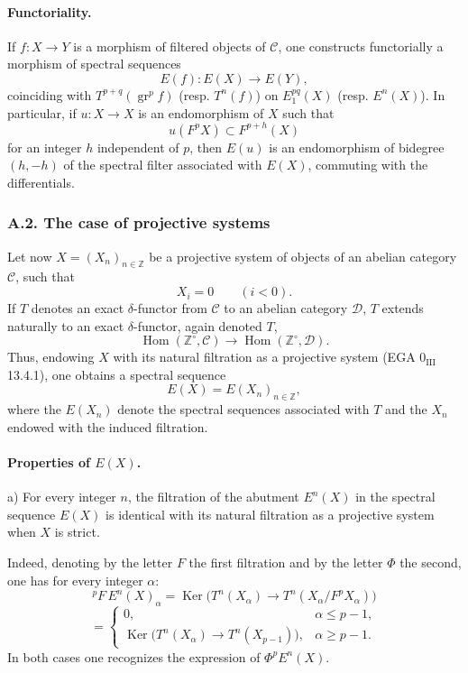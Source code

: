 \documentclass[11pt]{article}
\DeclareMathOperator{\Hom}{Hom}
\providecommand{\Ker}{\operatorname{Ker}}
\providecommand{\gr}{\operatorname{gr}}
\providecommand{\Hom}{\operatorname{Hom}}
\providecommand{\Ker}{\operatorname{Ker}}
\providecommand{\gr}{\operatorname{gr}}
\providecommand{\gr}{\operatorname{gr}}
\providecommand{\Ker}{\operatorname{Ker}}
\providecommand{\Hom}{\operatorname{Hom}}
\begin{document}
\paragraph{Functoriality.}
If \(f:X\to Y\) is a morphism of filtered objects of \(\mathcal C\), one constructs functorially a morphism of spectral sequences
\[
E(f):E(X)\longrightarrow E(Y),
\]
coinciding with \(T^{p+q}(\gr^p f)\) (resp. \(T^n(f)\)) on \(E_1^{pq}(X)\) (resp. \(E^n(X)\)). In particular, if \(u:X\to X\) is an endomorphism of \(X\) such that
\[
u(F^pX)\subset F^{p+h}(X)
\]
for an integer \(h\) independent of \(p\), then \(E(u)\) is an endomorphism of bidegree \((h,-h)\) of the spectral filter associated with \(E(X)\), commuting with the differentials.

\subsubsection*{A.2. The case of projective systems}
Let now \(X=(X_n)_{n\in\mathbb Z}\) be a projective system of objects of an abelian category \(\mathcal C\), such that
\[
X_i=0\qquad(i<0).
\]
If \(T\) denotes an exact \(\delta\)-functor from \(\mathcal C\) to an abelian category \(\mathcal D\), \(T\) extends naturally to an exact \(\delta\)-functor, again denoted \(T\),
\[
\Hom(\mathbb Z^\circ,\mathcal C)\longrightarrow \Hom(\mathbb Z^\circ,\mathcal D).
\]
Thus, endowing \(X\) with its natural filtration as a projective system (EGA \(0_{\mathrm{III}}\) 13.4.1), one obtains a spectral sequence
\[
E(X)=E(X_n)_{n\in\mathbb Z},
\]
where the \(E(X_n)\) denote the spectral sequences associated with \(T\) and the \(X_n\) endowed with the induced filtration.

\paragraph{Properties of \(E(X)\).}
a) For every integer \(n\), the filtration of the abutment \(E^n(X)\) in the spectral sequence \(E(X)\) is identical with its natural filtration as a projective system when \(X\) is strict.

Indeed, denoting by the letter \(F\) the first filtration and by the letter \(\Phi\) the second, one has for every integer \(\alpha\):
\[
{}^pF\,E^n(X)_\alpha
=\Ker\bigl(T^n(X_\alpha)\longrightarrow T^n(X_\alpha/F^pX_\alpha)\bigr)
\]
\[
=
\begin{cases}
0,& \alpha\le p-1,\\
\Ker\bigl(T^n(X_\alpha)\longrightarrow T^n(X_{p-1})\bigr),& \alpha\ge p-1.
\end{cases}
\]
In both cases one recognizes the expression of \(\Phi^pE^n(X)\).
\end{document}
